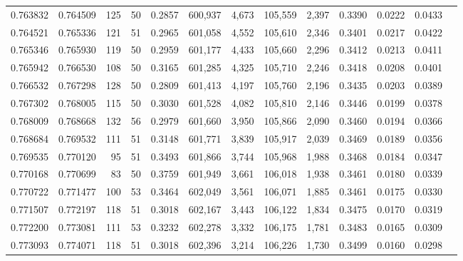 \begin{tabular}{rrrrrrrrrrrrr}
0.763832 & 0.764509 &   125 &  50 &                                     0.2857 & 600,937 &   4,673 & 105,559 &   2,397 & 0.3390 & 0.0222 & 0.0433 \\
0.764521 & 0.765336 &   121 &  51 &                                     0.2965 & 601,058 &   4,552 & 105,610 &   2,346 & 0.3401 & 0.0217 & 0.0422 \\
0.765346 & 0.765930 &   119 &  50 &                                     0.2959 & 601,177 &   4,433 & 105,660 &   2,296 & 0.3412 & 0.0213 & 0.0411 \\
0.765942 & 0.766530 &   108 &  50 &                                     0.3165 & 601,285 &   4,325 & 105,710 &   2,246 & 0.3418 & 0.0208 & 0.0401 \\
0.766532 & 0.767298 &   128 &  50 &                                     0.2809 & 601,413 &   4,197 & 105,760 &   2,196 & 0.3435 & 0.0203 & 0.0389 \\
0.767302 & 0.768005 &   115 &  50 &                                     0.3030 & 601,528 &   4,082 & 105,810 &   2,146 & 0.3446 & 0.0199 & 0.0378 \\
0.768009 & 0.768668 &   132 &  56 &                                     0.2979 & 601,660 &   3,950 & 105,866 &   2,090 & 0.3460 & 0.0194 & 0.0366 \\
0.768684 & 0.769532 &   111 &  51 &                                     0.3148 & 601,771 &   3,839 & 105,917 &   2,039 & 0.3469 & 0.0189 & 0.0356 \\
0.769535 & 0.770120 &    95 &  51 &                                     0.3493 & 601,866 &   3,744 & 105,968 &   1,988 & 0.3468 & 0.0184 & 0.0347 \\
0.770168 & 0.770699 &    83 &  50 &                                     0.3759 & 601,949 &   3,661 & 106,018 &   1,938 & 0.3461 & 0.0180 & 0.0339 \\
0.770722 & 0.771477 &   100 &  53 &                                     0.3464 & 602,049 &   3,561 & 106,071 &   1,885 & 0.3461 & 0.0175 & 0.0330 \\
0.771507 & 0.772197 &   118 &  51 &                                     0.3018 & 602,167 &   3,443 & 106,122 &   1,834 & 0.3475 & 0.0170 & 0.0319 \\
0.772200 & 0.773081 &   111 &  53 &                                     0.3232 & 602,278 &   3,332 & 106,175 &   1,781 & 0.3483 & 0.0165 & 0.0309 \\
0.773093 & 0.774071 &   118 &  51 &                                     0.3018 & 602,396 &   3,214 & 106,226 &   1,730 & 0.3499 & 0.0160 & 0.0298 \\

\end{tabular}
